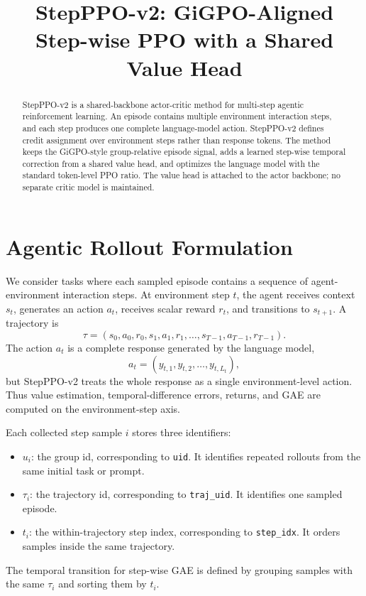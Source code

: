 \documentclass[10pt]{article}
\title{StepPPO-v2: GiGPO-Aligned Step-wise PPO with a Shared Value Head}
\author{}
\date{}
\begin{document}
\maketitle
\vspace{-1.5em}

\begin{abstract}
StepPPO-v2 is a shared-backbone actor-critic method for multi-step agentic reinforcement learning. An episode contains multiple environment interaction steps, and each step produces one complete language-model action. StepPPO-v2 defines credit assignment over environment steps rather than response tokens. The method keeps the GiGPO-style group-relative episode signal, adds a learned step-wise temporal correction from a shared value head, and optimizes the language model with the standard token-level PPO ratio. The value head is attached to the actor backbone; no separate critic model is maintained.
\end{abstract}

\section{Agentic Rollout Formulation}
We consider tasks where each sampled episode contains a sequence of agent-environment interaction steps. At environment step $t$, the agent receives context $s_t$, generates an action $a_t$, receives scalar reward $r_t$, and transitions to $s_{t+1}$. A trajectory is
\begin{equation}
\tau=(s_0,a_0,r_0,s_1,a_1,r_1,\ldots,s_{T-1},a_{T-1},r_{T-1}).
\end{equation}
The action $a_t$ is a complete response generated by the language model,
\begin{equation}
a_t=(y_{t,1},y_{t,2},\ldots,y_{t,L_t}),
\end{equation}
but StepPPO-v2 treats the whole response as a single environment-level action. Thus value estimation, temporal-difference errors, returns, and GAE are computed on the environment-step axis.

Each collected step sample $i$ stores three identifiers:
\begin{itemize}
\item $u_i$: the group id, corresponding to \texttt{uid}. It identifies repeated rollouts from the same initial task or prompt.
\item $\tau_i$: the trajectory id, corresponding to \texttt{traj\_uid}. It identifies one sampled episode.
\item $t_i$: the within-trajectory step index, corresponding to \texttt{step\_idx}. It orders samples inside the same trajectory.
\end{itemize}
The temporal transition for step-wise GAE is defined by grouping samples with the same $\tau_i$ and sorting them by $t_i$.
\end{document}
